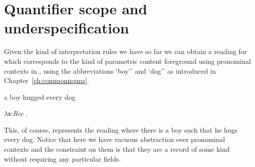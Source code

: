 \section{Quantifier scope and underspecification}

Given the kind of interpretation rules we have so far we can obtain a
reading for  which corresponds to the kind of parametric
content foreground using pronominal contexts
in , using the abbreviations `boy$'$' and `dog$'$' as
introduced in Chapter~\ref{ch:commonnouns}.
\begin{ex} 
\begin{subex} 
 
\item a boy hugged every dog 
 
\item $\lambda \mathfrak{s}$:\textit{Rec} . 
 
\end{subex} 
   
\end{ex} 
This, of course, represents the reading where there is a boy such that
he hugs every dog.  Notice that here we have vacuous abstraction over
pronominal contexts and the constraint on them is that they are a record of
some kind without requiring any particular fields.    

